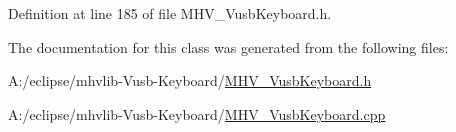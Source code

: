 Definition at line 185 of file M\-H\-V\-\_\-\-Vusb\-Keyboard.\-h.



The documentation for this class was generated from the following files\-:\begin{DoxyCompactItemize}
\item 
A\-:/eclipse/mhvlib-\/\-Vusb-\/\-Keyboard/\hyperlink{_m_h_v___vusb_keyboard_8h}{M\-H\-V\-\_\-\-Vusb\-Keyboard.\-h}\item 
A\-:/eclipse/mhvlib-\/\-Vusb-\/\-Keyboard/\hyperlink{_m_h_v___vusb_keyboard_8cpp}{M\-H\-V\-\_\-\-Vusb\-Keyboard.\-cpp}\end{DoxyCompactItemize}

